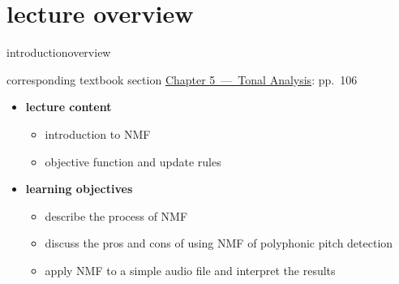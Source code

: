 




\subtitle{Module 5.5: Non-negative Matrix Factorization for Fundamental Frequency Detection}


	

    \section[overview]{lecture overview}
        \begin{frame}{introduction}{overview}
            \begin{block}{corresponding textbook section}
                    \href{http://ieeexplore.ieee.org/xpl/articleDetails.jsp?arnumber=6331122}{Chapter 5~---~Tonal Analysis}: pp.~106
            \end{block}

            \begin{itemize}
                \item   \textbf{lecture content}
                    \begin{itemize}
                        \item   introduction to NMF
                        \item   objective function and update rules
                    \end{itemize}
                \bigskip
                \item<2->   \textbf{learning objectives}
                    \begin{itemize}
                        \item   describe the process of NMF
                        \item   discuss the pros and cons of using NMF of polyphonic pitch detection
                        \item   apply NMF to a simple audio file and interpret the results
                    \end{itemize}
            \end{itemize}
        \end{frame}


